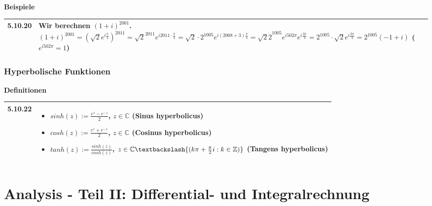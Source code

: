     \noindent
    \textbf{Beispiele}
    \begin{table}[H]
    \begin{tabularx}{\textwidth}{X m{16cm}}
        \toprule

        5.10.20&Wir berechnen $(1+i)^{2001}$. \hfill \break
                $(1+i)^{2001} = (\sqrt{2}e^{i\frac{\pi}{4}})^{2011} = \sqrt{2}^{2011} e^{i2011\cdot \frac{\pi}{4}} =
                \sqrt{2} \cdot 2^{1005} e^{i(2008+3)\frac{\pi}{4}} = \sqrt{2} \dot 2^1005 e^{i502\pi}e^{i\frac{3\pi}{4}}= 
                2^{1005} \cdot \sqrt{2} e^{i\frac{3\pi}{4}} = 2^{1005} (-1+i)$ ($e^{i502\pi} =1$)\\

        \bottomrule
    \end{tabularx}
    \end{table}

\subsubsection{Hyperbolische Funktionen}

    \noindent
    \textbf{Definitionen}
    \begin{table}[H]  
    \begin{tabularx}{\textwidth}{X m{16cm}}
        \toprule

        5.10.22&\begin{itemize}[topsep=-0.5cm]
                    \item[] $sinh(z) := \frac{e^z-e^{-z}}{2}$, $z \in \mathbb{C}$ (\textbf{Sinus hyperbolicus})
                    \item[] $cosh(z) := \frac{e^z+e^{-z}}{2}$, $z \in \mathbb{C}$ (\textbf{Cosinus hyperbolicus})
                    \item[] $tanh(z) := \frac{sinh(z)}{cosh(z)}$, $z \in \mathbb{C} \textbackslash \{(k\pi + \frac{\pi}{2}i: k \in \mathbb{Z})\}$ (\textbf{Tangens hyperbolicus})
                \end{itemize} \vspace{-0cm} \\

        \bottomrule

    \end{tabularx}
    \end{table}

    \pagebreak

\section{Analysis - Teil II: Differential- und Integralrechnung}
